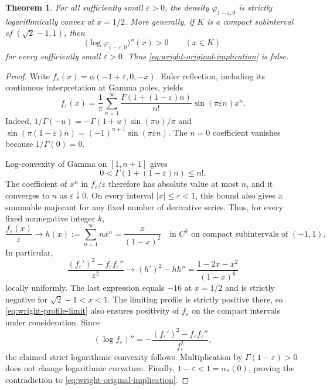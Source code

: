 \documentclass[11pt,a4paper]{article}
\newtheorem{theorem}{Theorem}[section]
\theoremstyle{definition}
\theoremstyle{remark}
\numberwithin{equation}{section}
\begin{document}
\begin{theorem}
\label{thm:wright-boundary}
For all sufficiently small $\varepsilon>0$, the density
$\varphi_{1-\varepsilon,0}$ is strictly logarithmically convex at
$x=1/2$. More generally, if $K$ is a compact subinterval of
$(\sqrt2-1,1)$, then
\[
 \bigl(\log\varphi_{1-\varepsilon,0}\bigr)''(x)>0
 \qquad(x\in K)
\]
for every sufficiently small $\varepsilon>0$. Thus
\eqref{eq:wright-original-implication} is false.
\end{theorem}

\begin{proof}
Write $f_\varepsilon(x)=\phi(-1+\varepsilon,0,-x)$. Euler reflection,
including its continuous interpretation at Gamma poles, yields
\begin{equation}
 f_\varepsilon(x)
 =\frac1\pi\sum_{n=1}^{\infty}
   \frac{\Gamma(1+(1-\varepsilon)n)}{n!}
   \sin(\pi\varepsilon n)x^n.
 \label{eq:wright-reflected-series}
\end{equation}
Indeed,
$1/\Gamma(-u)=-\Gamma(1+u)\sin(\pi u)/\pi$ and
$\sin(\pi(1-\varepsilon)n)=(-1)^{n+1}\sin(\pi\varepsilon n)$.
The $n=0$ coefficient vanishes because $1/\Gamma(0)=0$.

Log-convexity of Gamma on $[1,n+1]$ gives
\[
 0<\Gamma(1+(1-\varepsilon)n)\leq n!.
\]
The coefficient of $x^n$ in $f_\varepsilon/\varepsilon$ therefore has
absolute value at most $n$, and it converges to $n$ as
$\varepsilon\downarrow0$. On every interval $|x|\leq r<1$, this bound
also gives a summable majorant for any fixed number of derivative
series. Thus, for every fixed nonnegative integer $k$,
\begin{equation}
 \frac{f_\varepsilon(x)}{\varepsilon}
 \longrightarrow h(x):=\sum_{n=1}^{\infty}nx^n
 =\frac{x}{(1-x)^2}
 \quad\text{in }C^k\text{ on compact subintervals of }(-1,1).
 \label{eq:wright-profile-limit}
\end{equation}
In particular,
\begin{equation}
 \frac{(f_\varepsilon')^2-f_\varepsilon f_\varepsilon''}
      {\varepsilon^2}
 \longrightarrow
 (h')^2-hh''
 =\frac{1-2x-x^2}{(1-x)^6}
 \label{eq:wright-profile-curvature}
\end{equation}
locally uniformly. The last expression equals $-16$ at $x=1/2$ and
is strictly negative for $\sqrt2-1<x<1$. The limiting profile is
strictly positive there, so \eqref{eq:wright-profile-limit} also
ensures positivity of $f_\varepsilon$ on the compact intervals under
consideration. Since
\[
 (\log f_\varepsilon)''
 =-\frac{(f_\varepsilon')^2-f_\varepsilon f_\varepsilon''}
          {f_\varepsilon^2},
\]
the claimed strict logarithmic convexity follows. Multiplication by
$\Gamma(1-\varepsilon)>0$ does not change logarithmic curvature.
Finally, $1-\varepsilon<1=\alpha_*(0)$, proving the contradiction to
\eqref{eq:wright-original-implication}.
\end{proof}
\end{document}
